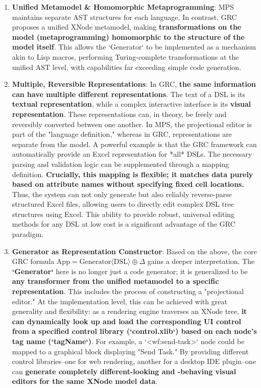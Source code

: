 \documentclass[11pt]{article}
\begin{document}
\begin{enumerate}
    \item \textbf{Unified Metamodel \& Homomorphic Metaprogramming}: MPS maintains separate AST structures for each language. In contrast, GRC proposes a unified XNode metamodel, making \textbf{transformations on the model (metaprogramming) homomorphic to the structure of the model itself}. This allows the `Generator` to be implemented as a mechanism akin to Lisp macros, performing Turing-complete transformations at the unified AST level, with capabilities far exceeding simple code generation.
    \item \textbf{Multiple, Reversible Representations}: In GRC, \textbf{the same information can have multiple different representations}. The text of a DSL is its \textbf{textual representation}, while a complex interactive interface is its \textbf{visual representation}. These representations can, in theory, be freely and reversibly converted between one another. In MPS, the projectional editor is part of the "language definition," whereas in GRC, representations are separate from the model. A powerful example is that the GRC framework can automatically provide an Excel representation for *all* DSLs. The necessary parsing and validation logic can be supplemented through a mapping definition. \textbf{Crucially, this mapping is flexible; it matches data purely based on attribute names without specifying fixed cell locations.} Thus, the system can not only generate but also reliably reverse-parse structured Excel files, allowing users to directly edit complex DSL tree structures using Excel. This ability to provide robust, universal editing methods for any DSL at low cost is a significant advantage of the GRC paradigm.
    \item \textbf{Generator as Representation Constructor}: Based on the above, the core GRC formula $\text{App} = \text{Generator}\langle\text{DSL}\rangle \oplus \Delta$ gains a deeper interpretation. The \textbf{`Generator`} here is no longer just a code generator; it is generalized to be \textbf{any transformer from the unified metamodel to a specific representation}. This includes the process of constructing a "projectional editor." At the implementation level, this can be achieved with great generality and flexibility: as a rendering engine traverses an XNode tree, \textbf{it can dynamically look up and load the corresponding UI control from a specified control library (`control.xlib`) based on each node's tag name (`tagName`)}. For example, a `<wf:send-task>` node could be mapped to a graphical block displaying "Send Task." By providing different control libraries--one for web rendering, another for a desktop IDE plugin--one can \textbf{generate completely different-looking and -behaving visual editors for the same XNode model data}.

\end{enumerate}
\end{document}
